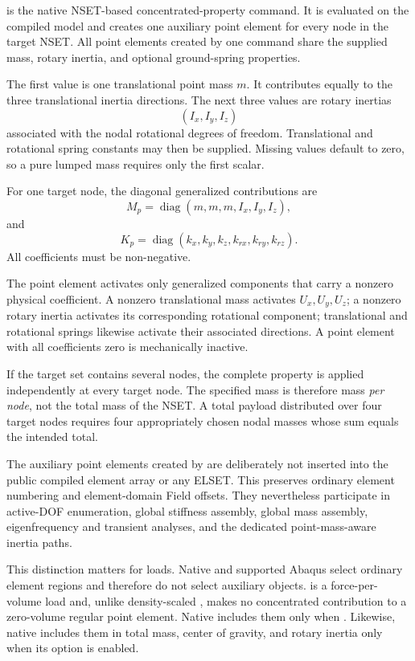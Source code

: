 
 is the native NSET-based concentrated-property command. It is evaluated on the compiled model and creates one auxiliary point element for every node in the target NSET. All point elements created by one command share the supplied mass, rotary inertia, and optional ground-spring properties.

The first value is one translational point mass \(m\). It contributes equally to the three translational inertia directions. The next three values are rotary inertias
\[
(I_x,I_y,I_z)
\]
associated with the nodal rotational degrees of freedom. Translational and rotational spring constants may then be supplied. Missing values default to zero, so a pure lumped mass requires only the first scalar.

For one target node, the diagonal generalized contributions are
\[
M_p=\operatorname{diag}(m,m,m,I_x,I_y,I_z),
\]
and
\[
K_p=\operatorname{diag}(k_x,k_y,k_z,k_{rx},k_{ry},k_{rz}).
\]
All coefficients must be non-negative.

The point element activates only generalized components that carry a nonzero physical coefficient. A nonzero translational mass activates \(U_x,U_y,U_z\); a nonzero rotary inertia activates its corresponding rotational component; translational and rotational springs likewise activate their associated directions. A point element with all coefficients zero is mechanically inactive.

If the target set contains several nodes, the complete property is applied independently at every target node. The specified mass is therefore mass \emph{per node}, not the total mass of the NSET. A total payload distributed over four target nodes requires four appropriately chosen nodal masses whose sum equals the intended total.

The auxiliary point elements created by  are deliberately not inserted into the public compiled element array or any ELSET. This preserves ordinary element numbering and element-domain Field offsets. They nevertheless participate in active-DOF enumeration, global stiffness assembly, global mass assembly, eigenfrequency and transient analyses, and the dedicated point-mass-aware inertia paths.

This distinction matters for loads. Native  and supported Abaqus  select ordinary element regions and therefore do not select auxiliary  objects.  is a force-per-volume load and, unlike density-scaled , makes no concentrated contribution to a zero-volume regular  point element. Native  includes them only when . Likewise, native  includes them in total mass, center of gravity, and rotary inertia only when its  option is enabled.

